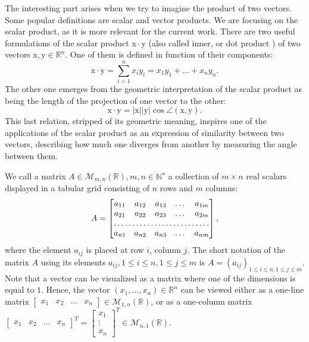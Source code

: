 \par The interesting part arises when we try to imagine the product of two vectors. Some popular definitions are scalar and vector products. We are focusing on the scalar product, as it is more relevant for the current work. There are two useful formulations of the scalar product $\mathrm{x}\cdot\mathrm{y}$ (also called inner, or dot product \cite{IntroVec}) of two vectors $\mathrm{x},\mathrm{y}\in\mathbb{R}^n$. One of them is defined in function of their components:
$$\mathrm{x}\cdot\mathrm{y}=\sum_{i=1}^{n}{x_i y_i}=x_1 y_1 + \ldots + x_n y_n.$$
The other one emerges from the geometric interpretation of the scalar product as being the length of the projection of one vector to the other:
$$\mathrm{x}\cdot\mathrm{y} = |\mathrm{x}||\mathrm{y}| \cos{\angle{(\mathrm{x},\mathrm{y})}}.$$
This last relation, stripped of its geometric meaning, inspires one of the applications of the scalar product as an expression of similarity between two vectors, describing how much one diverges from another by measuring the angle between them. \cite{cossim}

\par We call a matrix $A \in\mathcal{M}_{m,n}(\mathbb{R}), m,n\in\mathbb{N}^\star$ a collection of $m \times n$ real scalars displayed in a tabular grid consisting of $n$ rows and $m$ columns:
$$ A = \begin{bmatrix}
    a_{11}       & a_{12} & a_{13} & \dots & a_{1m} \\
    a_{21}       & a_{22} & a_{23} & \dots & a_{2m} \\
    \hdotsfor{5} \\
    a_{n1}       & a_{n2} & a_{n3} & \dots & a_{nm}
\end{bmatrix},$$
where the element $a_{i j}$ is placed at row $i$, column $j$. \cite{LinAlSchaum}
The short notation of the matrix $A$ using its elements $a_{i j}, 1 \leq i \leq n, 1 \leq j \leq m$ is $A=(a_{i j})_{1 \leq i \leq n, 1 \leq j \leq m }$.
Note that a vector can be visualized as a matrix where one of the dimensions is equal to $1$. Hence, the vector $(x_1,\ldots,x_n)\in\mathbb{R}^n$ can be viewed either as a 
one-line matrix $ \begin{bmatrix} x_{1} & x_{2} & \dots & x_{n}  \end{bmatrix}\in \mathcal{M}_{1,n}(\mathbb{R}) $, or as a one-column matrix
$ \begin{bmatrix} x_{1} & x_{2} & \dots & x_{n}  \end{bmatrix}^T = \begin{bmatrix} x_{1} \\ \vdots \\ x_{n}  \end{bmatrix}^T \in \mathcal{M}_{n,1}(\mathbb{R}) $.


